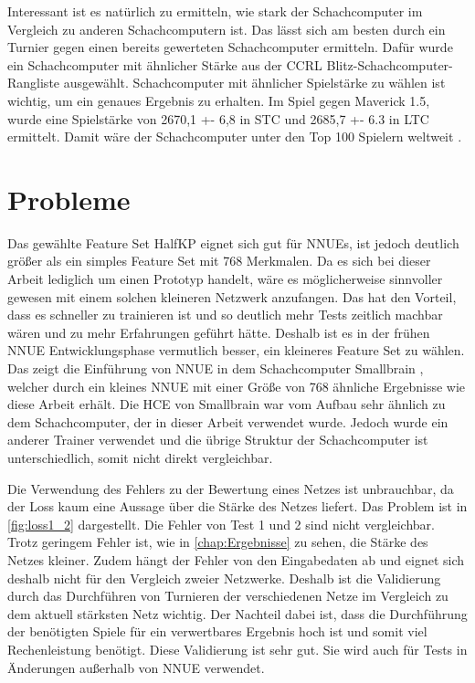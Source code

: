 Interessant ist es natürlich zu ermitteln, wie stark der Schachcomputer im Vergleich zu anderen Schachcomputern ist. Das lässt sich am besten durch ein Turnier gegen einen bereits gewerteten Schachcomputer ermitteln. Dafür wurde ein Schachcomputer mit ähnlicher Stärke aus der \ac{CCRL} \cite{CCRL} Blitz-Schachcomputer-Rangliste ausgewählt. Schachcomputer mit ähnlicher Spielstärke zu wählen ist wichtig, um ein genaues Ergebnis zu erhalten. Im Spiel gegen Maverick 1.5, wurde eine Spielstärke von 2670,1 +- 6,8 in \ac{STC} und 2685,7 +- 6.3 in \ac{LTC} ermittelt. Damit wäre der Schachcomputer unter den Top 100 Spielern weltweit \cite{FIDERating}.

\section{Probleme}

Das gewählte Feature Set HalfKP eignet sich gut für \acp{NNUE}, ist jedoch deutlich größer als ein simples Feature Set mit 768 Merkmalen. Da es sich bei dieser Arbeit lediglich um einen Prototyp handelt, wäre es möglicherweise sinnvoller gewesen mit einem solchen kleineren Netzwerk anzufangen. Das hat den Vorteil, dass es schneller zu trainieren ist und so deutlich mehr Tests zeitlich machbar wären und zu mehr Erfahrungen geführt hätte. Deshalb ist es in der frühen \ac{NNUE} Entwicklungsphase vermutlich besser, ein kleineres Feature Set zu wählen. Das zeigt die Einführung von \ac{NNUE} in dem Schachcomputer Smallbrain \cite{Smallbrain}, welcher durch ein kleines \ac{NNUE} mit einer Größe von 768 ähnliche Ergebnisse wie diese Arbeit erhält. Die \ac{HCE} von Smallbrain war vom Aufbau sehr ähnlich zu dem Schachcomputer, der in dieser Arbeit verwendet wurde. Jedoch wurde ein anderer Trainer verwendet und die übrige Struktur der Schachcomputer ist unterschiedlich, somit nicht direkt vergleichbar.

Die Verwendung des Fehlers zu der Bewertung eines Netzes ist unbrauchbar, da der Loss kaum eine Aussage über die Stärke des Netzes liefert. Das Problem ist in \autoref{fig:loss1_2} dargestellt. Die Fehler von Test 1 und 2 sind nicht vergleichbar. Trotz geringem Fehler ist, wie in \autoref{chap:Ergebnisse} zu sehen, die Stärke des Netzes kleiner. Zudem hängt der Fehler von den Eingabedaten ab und eignet sich deshalb nicht für den Vergleich zweier Netzwerke. Deshalb ist die Validierung durch das Durchführen von Turnieren der verschiedenen Netze im Vergleich zu dem aktuell stärksten Netz wichtig. Der Nachteil dabei ist, dass die Durchführung der benötigten Spiele für ein verwertbares Ergebnis hoch ist und somit viel Rechenleistung benötigt. Diese Validierung ist sehr gut. Sie wird auch für Tests in Änderungen außerhalb von \ac{NNUE} verwendet.

